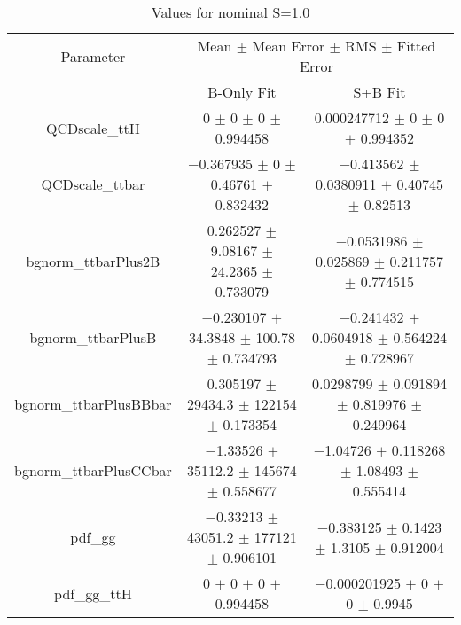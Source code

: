 \begin{table}
\centering
\caption{Values for nominal S=1.0}
\begin{tabular}{ccc}
\toprule
Parameter & \multicolumn{2}{c}{Mean $\pm$ Mean Error $\pm$ RMS $\pm$ Fitted Error}\\
 & B-Only Fit & S+B Fit\\
\midrule
QCDscale\_ttH & \num{0} $\pm$ \num{0} $\pm$ \num{0} $\pm$ \num{0.994458} & \num{0.000247712} $\pm$ \num{0} $\pm$ \num{0} $\pm$ \num{0.994352}\\
QCDscale\_ttbar & \num{-0.367935} $\pm$ \num{0} $\pm$ \num{0.46761} $\pm$ \num{0.832432} & \num{-0.413562} $\pm$ \num{0.0380911} $\pm$ \num{0.40745} $\pm$ \num{0.82513}\\
bgnorm\_ttbarPlus2B & \num{0.262527} $\pm$ \num{9.08167} $\pm$ \num{24.2365} $\pm$ \num{0.733079} & \num{-0.0531986} $\pm$ \num{0.025869} $\pm$ \num{0.211757} $\pm$ \num{0.774515}\\
bgnorm\_ttbarPlusB & \num{-0.230107} $\pm$ \num{34.3848} $\pm$ \num{100.78} $\pm$ \num{0.734793} & \num{-0.241432} $\pm$ \num{0.0604918} $\pm$ \num{0.564224} $\pm$ \num{0.728967}\\
bgnorm\_ttbarPlusBBbar & \num{0.305197} $\pm$ \num{29434.3} $\pm$ \num{122154} $\pm$ \num{0.173354} & \num{0.0298799} $\pm$ \num{0.091894} $\pm$ \num{0.819976} $\pm$ \num{0.249964}\\
bgnorm\_ttbarPlusCCbar & \num{-1.33526} $\pm$ \num{35112.2} $\pm$ \num{145674} $\pm$ \num{0.558677} & \num{-1.04726} $\pm$ \num{0.118268} $\pm$ \num{1.08493} $\pm$ \num{0.555414}\\
pdf\_gg & \num{-0.33213} $\pm$ \num{43051.2} $\pm$ \num{177121} $\pm$ \num{0.906101} & \num{-0.383125} $\pm$ \num{0.1423} $\pm$ \num{1.3105} $\pm$ \num{0.912004}\\
pdf\_gg\_ttH & \num{0} $\pm$ \num{0} $\pm$ \num{0} $\pm$ \num{0.994458} & \num{-0.000201925} $\pm$ \num{0} $\pm$ \num{0} $\pm$ \num{0.9945}\\
\bottomrule
\end{tabular}
\end{table}